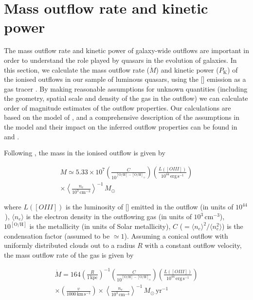 \section{Mass outflow rate and kinetic power}

The mass outflow rate and kinetic power of galaxy-wide outflows are important in order to understand the role played by quasars in the evolution of galaxies. 
In this section, we calculate the mass outflow rate ($\dot{M}$) and kinetic power ($P_{\text{K}}$) of the ionised outflows in our sample of luminous quasars, using the [] emission as a gas tracer \citep[e.g.][]{harrison12,cano-diaz12,liu13,brusa15,carniani15,bischetti16,kakkad16}.  
By making reasonable assumptions for unknown quantities (including the geometry, spatial scale and density of the gas in the outflow) we can calculate order of magnitude estimates of the outflow properties.
Our calculations are based on the model of \citet{cano-diaz12}, and a comprehensive description of the assumptions in the model and their impact on the inferred outflow properties can be found in \citet{cano-diaz12} and \citet{kakkad16}. 

Following \citet{cano-diaz12}, the mass in the ionised outflow is given by 

\begingroup\makeatletter{}\check@mathfonts
\begin{eqnarray}
M \simeq 5.33 \times 10^7 \left( \frac{C}{10^{[\text{O/H}] - [\text{O/H}]_\odot}} \right) \left( \frac{L([OIII])}{10^{44}\, \text{erg}\,\text{s}^{-1}}\right) \nonumber \\ \times \left\langle \frac{n_e}{10^3\, \text{cm}^{-3}} \right\rangle^{-1} \, M_\odot
\end{eqnarray}
\endgroup

\noindent where $L([OIII])$ is the luminosity of [] emitted in the outflow (in units of $10^{44}$\,\ergs), $\langle n_e \rangle$ is the electron density in the outflowing gas (in units of $10^3$\,cm$^{-3}$), $10^{[\text{O/H}]}$ is the metallicity (in units of Solar metallicity), $C$ ($=\langle n_e \rangle ^2 / \langle n_e^2\rangle$) is the condensation factor (assumed to be $\simeq1$). 
Assuming a conical outflow with uniformly distributed clouds out to a radius $R$ with a constant outflow velocity, the mass outflow rate of the gas is given by

\begingroup\makeatletter{}\check@mathfonts
\begin{eqnarray}
\dot{M} = 164 \left( \frac{R}{1\,\text{kpc}} \right)^{-1} \left( \frac{C}{10^{[\text{O/H}] - [\text{O/H}]_\odot}} \right) \left( \frac{L([OIII])}{10^{44}\, \text{erg}\,\text{s}^{-1}}\right) \nonumber \\ \times \left( \frac{v}{1000\,\text{km}\,\text{s}^{-1}}\right) \times \left\langle  \frac{n_e}{10^3\, \text{cm}^{-3}} \right\rangle^{-1} \, M_\odot \, \text{yr}^{-1}
\end{eqnarray}
\endgroup

